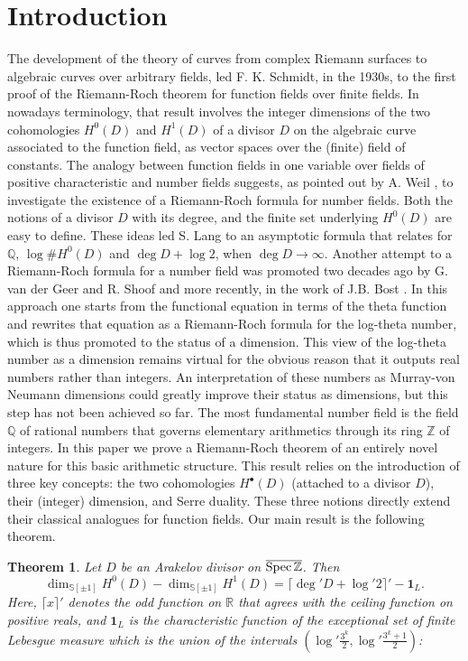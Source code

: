 \documentclass[cupthm]{CUP-JNL-JMJ}
\numberwithin{equation}{section}
\theoremstyle{cupplain}
\newtheorem{theorem}{Theorem}[section]
\theoremstyle{cupdefinition}
\theoremstyle{cupremark}
\theoremstyle{cupproof}
\def\Q{{\mathbb Q}}
\def\R{{\mathbb R}}
\def\S{{\mathbb S}}
\def\Z{{\mathbb Z}}
\def\Spec{{\rm Spec\,}}
\def\sss{{\S}}
\def\spm{{\sss[\pm 1]}}
\def\spzb{{\overline{\Spec\Z}}}
\begin{document}
\section{Introduction}
\label{sec1}


The  development of the  theory of curves from  complex Riemann surfaces to algebraic curves   over arbitrary fields, led F. K. Schmidt, in the 1930s, to the first proof of the Riemann-Roch theorem for function fields over  finite fields.  In nowadays terminology, that result involves the integer dimensions of the two cohomologies $H^0(D)$ and $H^1(D)$ of a divisor $D$ on the algebraic curve associated to the function field, as vector spaces over the (finite) field of constants.  The analogy between function fields in one variable over  fields of positive characteristic and number fields suggests, as  pointed out by A. Weil \cite{Weil39},  to  investigate the existence of a Riemann-Roch formula for number fields. Both the notions of a divisor $D$ with its degree, and the finite set underlying $H^0(D)$ are easy to define. These ideas  led S. Lang \cite{Lang} to   an asymptotic  formula  that relates for $\Q$, $\log \# H^0(D)$ and  $\deg D+ \log 2$, when $\deg D\to \infty$.  Another  attempt to  a Riemann-Roch formula for a number field  was promoted two decades ago by G. van der Geer and R. Shoof \cite{vGS} and  more  recently,  in the work of J.B. Bost \cite{Bost}. In this approach one starts from the functional equation in terms of the theta function  and rewrites that equation as a Riemann-Roch formula for the log-theta number, which is thus promoted to the status of a dimension. This view of the log-theta number as  a dimension remains  virtual  for the obvious reason that it outputs real numbers rather than integers. An  interpretation of these numbers as Murray-von Neumann dimensions could greatly improve their status  as dimensions, but  this step has not been achieved so far. \newline
The  most fundamental number field is the field $\Q$ of rational numbers that governs elementary arithmetics through its ring $\Z$ of integers. In this paper we prove a Riemann-Roch theorem of an entirely novel nature for this basic arithmetic structure. This result relies on the introduction of  three key concepts: the two cohomologies $H^\bullet(D)$ (attached to a divisor $D$),  their (integer) dimension, and Serre duality. These three notions directly extend their classical analogues for function fields. 
Our main result is the following theorem.
\begin{theorem} \label{rrspzbintro} 
Let $D$ be an Arakelov divisor on $\spzb$. Then 
\begin{equation}\label{rrforq1intro}
\dim_{\spm}H^0(D)-\dim_{\spm}H^1(D)=\bigg\lceil \deg' D+ \log' 2\bigg\rceil'	-\mathbf 1_L.
\end{equation}
Here,  $\lceil x \rceil'$ denotes the odd function on $\R$ that agrees with the ceiling function on positive reals, and $\mathbf{1}_L$ is the characteristic function of the exceptional set of finite Lebesgue measure which is the union of the intervals $(\log' \frac{3^k}{2},\log' \frac{3^k+1}{2})$:
\end{theorem}
\end{document}
